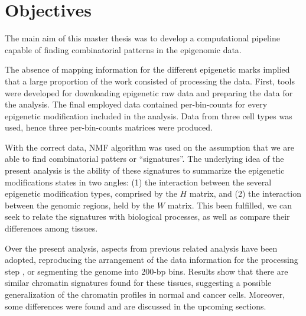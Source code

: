 \section{Objectives}

The main aim of this master thesis was to develop a computational pipeline capable of finding combinatorial patterns in the epigenomic data.

The absence of mapping information for the different epigenetic marks implied that a large proportion of the work consisted of processing the data. First, tools were developed for downloading epigenetic raw data and preparing the data for the analysis. The final employed data contained per-bin-counts for every epigenetic modification included in the analysis. Data from three cell types was used, hence three per-bin-counts matrices were produced.

With the correct data, NMF algorithm was used on the assumption that we are able to find combinatorial patters or ``signatures''. The underlying idea of the present analysis is the ability of these signatures to summarize the epigenetic modifications states in two angles: (1) the interaction between the several epigenetic modification types, comprised by the \(H\) matrix, and (2) the interaction between the genomic regions, held by the \(W\) matrix. This been fulfilled, we can seek to relate the signatures with biological processes, as well as compare their differences among tissues.

Over the present analysis, aspects from previous related analysis have been adopted, reproducing the arrangement of the data information for the processing step \cite{Gandolfi2017}, or segmenting the genome into 200-bp bins. Results show that there are similar chromatin signatures found for these tissues, suggesting a possible generalization of the chromatin profiles in normal and cancer cells. Moreover, some differences were found and are discussed in the upcoming sections.
